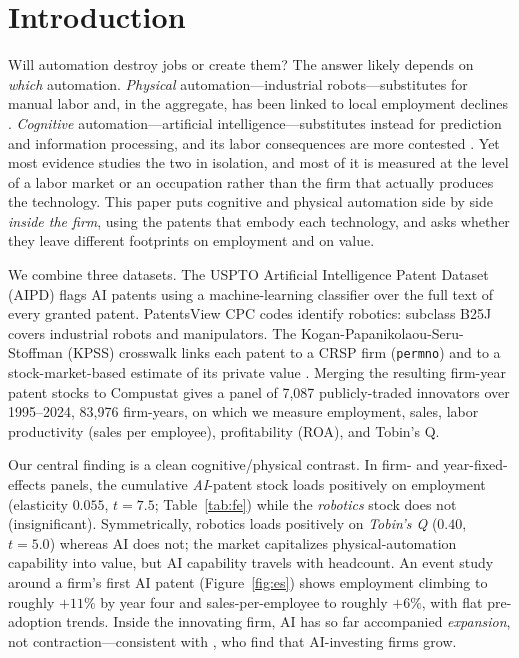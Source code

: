 \documentclass[12pt]{article}
\begin{document}
\newpage
\section{Introduction}\label{sec:intro}
Will automation destroy jobs or create them? The answer likely depends on \emph{which}
automation. \emph{Physical} automation---industrial robots---substitutes for manual labor and,
in the aggregate, has been linked to local employment declines \citep{acemoglu2020,graetz2018}.
\emph{Cognitive} automation---artificial intelligence---substitutes instead for prediction and
information processing, and its labor consequences are more contested \citep{autor2015,webb2020,
babina2024}. Yet most evidence studies the two in isolation, and most of it is measured at the
level of a labor market or an occupation rather than the firm that actually produces the
technology. This paper puts cognitive and physical automation side by side \emph{inside the
firm}, using the patents that embody each technology, and asks whether they leave different
footprints on employment and on value.

We combine three datasets. The USPTO Artificial Intelligence Patent Dataset (AIPD) flags AI
patents using a machine-learning classifier over the full text of every granted patent.
PatentsView CPC codes identify robotics: subclass B25J covers industrial robots and manipulators.
The Kogan-Papanikolaou-Seru-Stoffman (KPSS) crosswalk links each patent to a CRSP firm
(\texttt{permno}) and to a stock-market-based estimate of its private value \citep{kpss2017}.
Merging the resulting firm-year patent stocks to Compustat gives a panel of 7{,}087
publicly-traded innovators over 1995--2024, 83{,}976 firm-years, on which we measure employment,
sales, labor productivity (sales per employee), profitability (ROA), and Tobin's Q.

Our central finding is a clean cognitive/physical contrast. In firm- and year-fixed-effects
panels, the cumulative \emph{AI}-patent stock loads positively on employment (elasticity
$0.055$, $t=7.5$; Table~\ref{tab:fe}) while the \emph{robotics} stock does not (insignificant).
Symmetrically, robotics loads positively on \emph{Tobin's Q} ($0.40$, $t=5.0$) whereas AI does
not; the market capitalizes physical-automation capability into value, but AI capability travels
with headcount. An event study around a firm's first AI patent (Figure~\ref{fig:es}) shows
employment climbing to roughly $+11\%$ by year four and sales-per-employee to roughly $+6\%$,
with flat pre-adoption trends. Inside the innovating firm, AI has so far accompanied
\emph{expansion}, not contraction---consistent with \citet{babina2024}, who find that
AI-investing firms grow.
\end{document}
